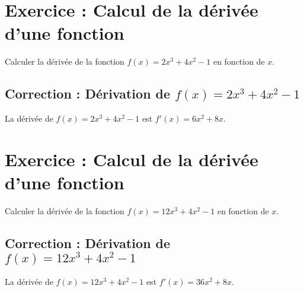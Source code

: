 \documentclass[a4paper, 12pt]{article}
\newenvironment{Exercice}[1][]{
    \section*{Exercice : #1}
}{}
\newenvironment{Correction}[1][]{
        \subsection*{\color{blue}Correction : #1}
        \color{blue} %
    }{}
\newenvironment{Correction}[1][]{\comment}{\endcomment}
\begin{document}
\begin{Exercice}[Calcul de la dérivée d'une fonction]
    Calculer la dérivée de la fonction $f(x) = 2x^3 + 4x^2 - 1$ en fonction de $x$.
    \begin{Correction}[Dérivation de $f(x) = 2x^3 + 4x^2 - 1$]
        La dérivée de $f(x) = 2x^3 + 4x^2 - 1$ est $f'(x) = 6x^2 + 8x$.
    \end{Correction}
\end{Exercice}


\begin{Exercice}[Calcul de la dérivée d'une fonction]
    Calculer la dérivée de la fonction $f(x) = 12x^3 + 4x^2 - 1$ en fonction de $x$.
    \begin{Correction}[Dérivation de $f(x) = 12x^3 + 4x^2 - 1$]

        La dérivée de $f(x) = 12x^3 + 4x^2 - 1$ est $f'(x) = 36x^2 + 8x$.
    \end{Correction}
\end{Exercice}
\end{document}
